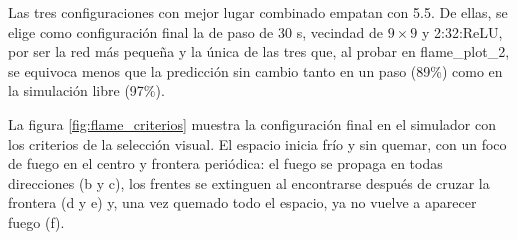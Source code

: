 	Las tres configuraciones con mejor lugar combinado empatan con 5.5. De ellas, se elige como configuración final la de paso de 30 s, vecindad de $9 \times 9$ y 2:32:ReLU, por ser la red más pequeña y la única de las tres que, al probar en flame\_plot\_2, se equivoca menos que la predicción sin cambio tanto en un paso (89\%) como en la simulación libre (97\%).

	La figura \ref{fig:flame_criterios} muestra la configuración final en el simulador con los criterios de la selección visual. El espacio inicia frío y sin quemar, con un foco de fuego en el centro y frontera periódica: el fuego se propaga en todas direcciones (b y c), los frentes se extinguen al encontrarse después de cruzar la frontera (d y e) y, una vez quemado todo el espacio, ya no vuelve a aparecer fuego (f).

	\newcommand{\estadoflame}[2][black]{\fcolorbox{gray}{flame#2}{\makebox[1.1em]{\textcolor{#1}{#2}}}}
	\newcommand{\leyendaflame}{%
		\par\medskip
		{\footnotesize\setlength{\fboxsep}{1pt}%
		Temperatura: \estadoflame{0}\estadoflame{1}\estadoflame{2}\estadoflame{3}\estadoflame{4}\estadoflame{5}%
		\estadoflame{6}\estadoflame{7}\estadoflame{8}\estadoflame{9}\estadoflame[white]{10}\estadoflame[white]{11}%
		\quad Quemado: \estadoflame[white]{12}\estadoflame[white]{13}\estadoflame[white]{14}\estadoflame{15}%
		\estadoflame{16}\estadoflame{17}\par}}


